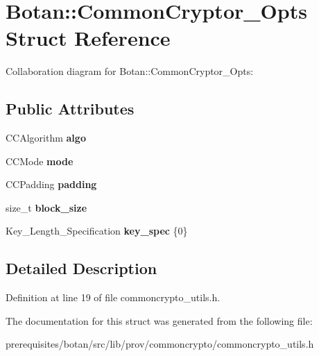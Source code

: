 \hypertarget{struct_botan_1_1_common_cryptor___opts}{}\section{Botan\+:\+:Common\+Cryptor\+\_\+\+Opts Struct Reference}
\label{struct_botan_1_1_common_cryptor___opts}


Collaboration diagram for Botan\+:\+:Common\+Cryptor\+\_\+\+Opts\+:
\subsection*{Public Attributes}
\begin{DoxyCompactItemize}
\item 
\mbox{\label{struct_botan_1_1_common_cryptor___opts_a1fff5525a1b11603cf0d3d6b18179d0c}} 
C\+C\+Algorithm {\bfseries algo}
\item 
\mbox{\label{struct_botan_1_1_common_cryptor___opts_aa781cd6fca4b1e5c0ff80cfc75082c8b}} 
C\+C\+Mode {\bfseries mode}
\item 
\mbox{\label{struct_botan_1_1_common_cryptor___opts_acfe82114e2c6520be69928c1a957ac84}} 
C\+C\+Padding {\bfseries padding}
\item 
\mbox{\label{struct_botan_1_1_common_cryptor___opts_acb4aad799bbd604e0d005fc61218870b}} 
size\+\_\+t {\bfseries block\+\_\+size}
\item 
\mbox{\label{struct_botan_1_1_common_cryptor___opts_a3480ad5cbb8bfdf1c7e4796eb4b0a559}} 
Key\+\_\+\+Length\+\_\+\+Specification {\bfseries key\+\_\+spec} \{0\}
\end{DoxyCompactItemize}


\subsection{Detailed Description}


Definition at line 19 of file commoncrypto\+\_\+utils.\+h.



The documentation for this struct was generated from the following file\+:\begin{DoxyCompactItemize}
\item 
prerequisites/botan/src/lib/prov/commoncrypto/commoncrypto\+\_\+utils.\+h\end{DoxyCompactItemize}
